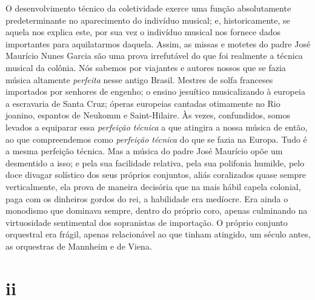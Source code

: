O desenvolvimento técnico da coletividade exerce uma função
absolutamente predeterminante no aparecimento do indivíduo musical; e,
historicamente, se aquela nos explica este, por sua vez o indivíduo
musical nos fornece dados importantes para aquilatarmos daquela. Assim,
as missas e motetes do padre José Maurício Nunes Garcia são uma prova
irrefutável do que foi realmente a técnica musical da colônia. Nós
sabemos por viajantes e autores nossos que se fazia música altamente
\textit{perfeita} nesse antigo Brasil. Mestres de solfa franceses importados
por senhores de engenho; o ensino jesuítico musicalizando à europeia a
escravaria de Santa Cruz; óperas europeias cantadas otimamente no Rio
joanino, espantos de Neukomm e Saint-Hilaire. Às vezes, confundidos,
somos levados a equiparar essa \textit{perfeição técnica} a que atingira a
nossa música de então, ao que compreendemos como \textit{perfeição técnica}
do que se fazia na Europa. Tudo é a mesma perfeição técnica. Mas a
música do padre José Maurício opõe um desmentido a isso; e pela sua
facilidade relativa, pela sua polifonia humilde, pelo doce divagar
solístico dos seus próprios conjuntos, aliás coralizados quase sempre
verticalmente, ela prova de maneira decisória que na mais hábil capela
colonial, paga com os dinheiros gordos do rei, a habilidade era
medíocre. Era ainda o monodismo que dominava sempre, dentro do próprio
coro, apenas culminando na virtuosidade sentimental dos sopranistas de
importação. O próprio conjunto orquestral era frágil, apenas
relacionável ao que tinham atingido, um século antes, as orquestras de
Mannheim e de Viena.

\section*{ii}

